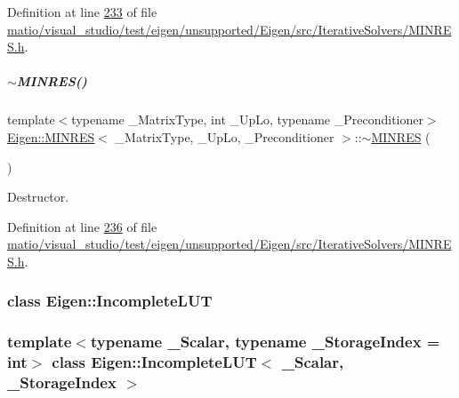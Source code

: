 Definition at line \hyperlink{matio_2visual__studio_2test_2eigen_2unsupported_2_eigen_2src_2_iterative_solvers_2_m_i_n_r_e_s_8h_source_l00233}{233} of file \hyperlink{matio_2visual__studio_2test_2eigen_2unsupported_2_eigen_2src_2_iterative_solvers_2_m_i_n_r_e_s_8h_source}{matio/visual\+\_\+studio/test/eigen/unsupported/\+Eigen/src/\+Iterative\+Solvers/\+M\+I\+N\+R\+E\+S.\+h}.

\mbox{\label{group___iterative_linear_solvers___module_a3f40ba58caac8b10ae7df474af93a05b}} 
\subparagraph{\texorpdfstring{$\sim$\+M\+I\+N\+R\+E\+S()}{~MINRES()}\hspace{0.1cm}{\footnotesize\ttfamily [2/2]}}
{\footnotesize\ttfamily template$<$typename \+\_\+\+Matrix\+Type, int \+\_\+\+Up\+Lo, typename \+\_\+\+Preconditioner$>$ \\
\hyperlink{group___iterative_linear_solvers___module_class_eigen_1_1_m_i_n_r_e_s}{Eigen\+::\+M\+I\+N\+R\+ES}$<$ \+\_\+\+Matrix\+Type, \+\_\+\+Up\+Lo, \+\_\+\+Preconditioner $>$\+::$\sim$\hyperlink{group___iterative_linear_solvers___module_class_eigen_1_1_m_i_n_r_e_s}{M\+I\+N\+R\+ES} (\begin{DoxyParamCaption}{ }\end{DoxyParamCaption})\hspace{0.3cm}{\ttfamily [inline]}}

Destructor. 

Definition at line \hyperlink{matio_2visual__studio_2test_2eigen_2unsupported_2_eigen_2src_2_iterative_solvers_2_m_i_n_r_e_s_8h_source_l00236}{236} of file \hyperlink{matio_2visual__studio_2test_2eigen_2unsupported_2_eigen_2src_2_iterative_solvers_2_m_i_n_r_e_s_8h_source}{matio/visual\+\_\+studio/test/eigen/unsupported/\+Eigen/src/\+Iterative\+Solvers/\+M\+I\+N\+R\+E\+S.\+h}.

\label{class_eigen_1_1_incomplete_l_u_t}
\subsubsection{class Eigen\+:\+:Incomplete\+L\+UT}
\subsubsection*{template$<$typename \+\_\+\+Scalar, typename \+\_\+\+Storage\+Index = int$>$\newline
class Eigen\+::\+Incomplete\+L\+U\+T$<$ \+\_\+\+Scalar, \+\_\+\+Storage\+Index $>$}

